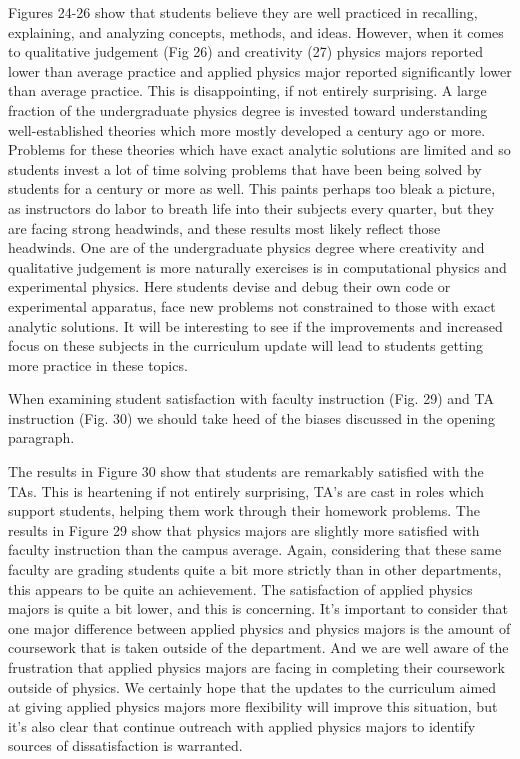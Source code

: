 \documentclass[12pt]{article}
\begin{document}
Figures 24-26 show that students believe they are well practiced in recalling, explaining, and analyzing concepts, methods, and ideas.  However, when it comes to qualitative judgement (Fig 26) and creativity (27) physics majors reported lower than average practice and applied physics major reported significantly lower than average practice.  This is disappointing, if not entirely surprising.  A large fraction of the undergraduate physics degree is invested toward understanding well-established theories which more mostly developed a century ago or more.  Problems for these theories which have exact analytic solutions are limited and so students invest a lot of time solving problems that have been being solved by students for a century or more as well.  This paints perhaps too bleak a picture, as instructors do labor to breath life into their subjects every quarter, but they are facing strong headwinds, and these results most likely reflect those headwinds.  One are of the undergraduate physics degree where creativity and qualitative judgement is more naturally exercises is in computational physics and experimental physics.  Here students devise and debug their own code or experimental apparatus, face new problems not constrained to those with exact analytic solutions.  It will be interesting to see if the improvements and increased focus on these subjects in the curriculum update will lead to students getting more practice in these topics.

When examining student satisfaction with faculty instruction (Fig. 29) and TA instruction (Fig. 30) we should take heed of the biases discussed in the opening paragraph.  

The results in Figure 30 show that students are remarkably satisfied with the TAs.  This is heartening if not entirely surprising, TA's are cast in roles which support students, helping them work through their homework problems.  The results in Figure 29 show that physics majors are slightly more satisfied with faculty instruction than the campus average.  Again, considering that these same faculty are grading students quite a bit more strictly than in other departments, this appears to be quite an achievement.  The satisfaction of applied physics majors is quite a bit lower, and this is concerning.
It's important to consider that one major difference between applied physics and physics majors is the amount of coursework that is taken outside of the department. And we are well aware of the frustration that applied physics majors are facing in completing their coursework outside of physics.  We certainly hope that the updates to the curriculum aimed at giving applied physics majors more flexibility will improve this situation, but it's also clear that continue outreach with applied physics majors to identify sources of dissatisfaction is warranted.
\end{document}

